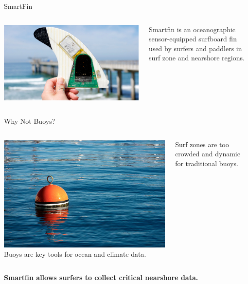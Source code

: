 \begin{frame}{SmartFin}
    \begin{columns}[c] 
        \begin{column}{0.5\textwidth}
            \centering
            \includegraphics[width=0.9\linewidth]{images/smartfin_picture.jpg}
        \end{column}
        \begin{column}{0.5\textwidth}
            Smartfin is an oceanographic sensor-equipped surfboard fin used by surfers and paddlers in surf zone and nearshore regions.
        \end{column}
    \end{columns}
\end{frame}
\begin{frame}{Why Not Buoys?}
    \begin{columns}[c]
        \begin{column}{0.5\textwidth}
            \centering
            \includegraphics[width=0.9\linewidth]{images/buoy.jpg}
            \vspace{0.5em}
            {\small Buoys are key tools for ocean and climate data.}
        \end{column}
        \begin{column}{0.5\textwidth}
            \centering
            \vspace{0.5em}
            {\small Surf zones are too crowded and dynamic for traditional buoys.}
        \end{column}
    \end{columns}
    \vspace{1em}
    \begin{center}
    \textbf{Smartfin allows surfers to collect critical nearshore data.}
    \end{center}
\end{frame}
